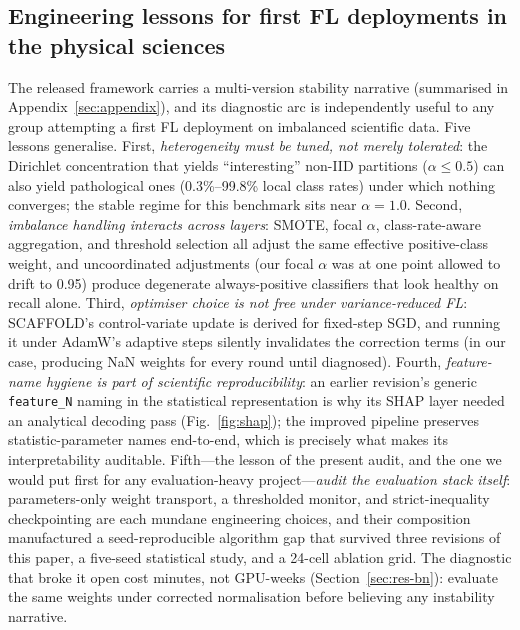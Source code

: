 \subsection{Engineering lessons for first FL deployments in the
physical sciences}

The released framework carries a multi-version stability narrative
(summarised in Appendix~\ref{sec:appendix}), and its diagnostic arc is
independently useful to any group attempting a first FL deployment on
imbalanced scientific data. Five lessons generalise. First,
\emph{heterogeneity must be tuned, not merely tolerated}: the Dirichlet
concentration that yields ``interesting'' non-IID partitions
($\alpha \le 0.5$) can also yield pathological ones (0.3\%--99.8\% local
class rates) under which nothing converges; the stable regime for this
benchmark sits near $\alpha = 1.0$. Second, \emph{imbalance handling
interacts across layers}: SMOTE, focal $\alpha$, class-rate-aware
aggregation, and threshold selection all adjust the same effective
positive-class weight, and uncoordinated adjustments (our focal
$\alpha$ was at one point allowed to drift to 0.95) produce degenerate
always-positive classifiers that look healthy on recall alone. Third,
\emph{optimiser choice is not free under variance-reduced FL}:
SCAFFOLD's control-variate update is derived for fixed-step SGD, and
running it under AdamW's adaptive steps silently invalidates the
correction terms (in our case, producing NaN weights for every round
until diagnosed). Fourth, \emph{feature-name hygiene is part of
scientific reproducibility}: an earlier revision's generic
\texttt{feature\_N} naming in the statistical representation is why
its SHAP layer needed an analytical decoding pass
(Fig.~\ref{fig:shap}); the improved pipeline preserves
statistic-parameter names end-to-end, which is precisely what makes
its interpretability auditable. Fifth---the lesson of the present audit, and the one
we would put first for any evaluation-heavy project---\emph{audit the
evaluation stack itself}: parameters-only weight transport, a
thresholded monitor, and strict-inequality checkpointing are each
mundane engineering choices, and their composition manufactured a
seed-reproducible algorithm gap that survived three revisions of this
paper, a five-seed statistical study, and a 24-cell ablation grid. The
diagnostic that broke it open cost minutes, not GPU-weeks
(Section~\ref{sec:res-bn}): evaluate the same weights under corrected
normalisation before believing any instability narrative.
